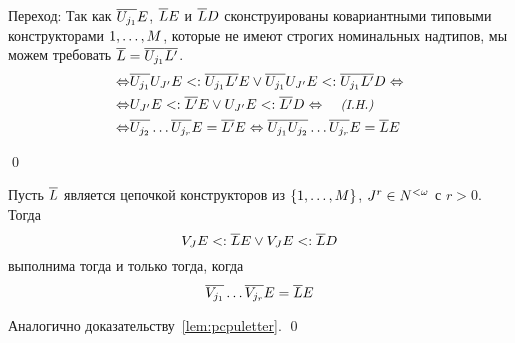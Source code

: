 \begin{proof*}
\begin{paragraph}{Переход:}
Так как  $\overline{{U}_{j_1}}{E}$, $\overline{{L}{}}{E}$ и $\overline{{L}{}}D$ сконструированы ковариантными типовыми конструкторами ${1},\ldots,{M}$, которые не имеют строгих номинальных надтипов, мы можем требовать $\overline{{L}{}}=\overline{{U}_{j_1}}\overline{{L}{}'}$.
\begin{align*}
     \Leftrightarrow&\overline{\pcpuword{j_1}}\pcpuword{J'}\pcpeconstr \subtype \overline{\pcpuword{j_1}}\overline{\pcplword{}'}\pcpeconstr \lor \overline{\pcpuword{j_1}}\pcpuword{J'}\pcpeconstr \subtype \overline{\pcpuword{j_1}}\overline{\pcplword{}'}\pcpdword \Leftrightarrow \\
     \Leftrightarrow&\pcpuword{J'}\pcpeconstr \subtype \overline{\pcplword{}'}\pcpeconstr \lor \pcpuword{J'}\pcpeconstr \subtype \overline{\pcplword{}'}\pcpdword \Leftrightarrow \textit{\small{(I.H.)}}\\
     \Leftrightarrow&\overline{\pcpuword{j_2}}\ldots\overline{\pcpuword{j_r}}\pcpeconstr = \overline{\pcplword{}'}\pcpeconstr \Leftrightarrow \overline{\pcpuword{j_1}}\overline{\pcpuword{j_2}}\ldots\overline{\pcpuword{j_r}}\pcpeconstr = \overline{\pcplword{}}\pcpeconstr
\end{align*}
\end{paragraph}
%
\qed\end{proof*}

\begin{lem}{\label{lem:pcpvletter}}
Пусть $\overline{{L}{}}$ является цепочкой конструкторов из $\{{1}{},\ldots,{M}{}\}$, $J^r\in N^{<\omega}$ с $r > 0$. Тогда
\[
    {V}_{J}{E} <: \overline{{L}{}}{E} \lor {V}_{J}{E} <: \overline{{L}{}}D
\]
выполнима тогда и только тогда, когда
\[
     \overline{{V}_{j_1}}\ldots\overline{{V}_{j_r}}{E} = \overline{{L}{}}{E}
\]
\end{lem}
\begin{proof*}
Аналогично доказательству~\autoref{lem:pcpuletter}.
\qed\end{proof*}

